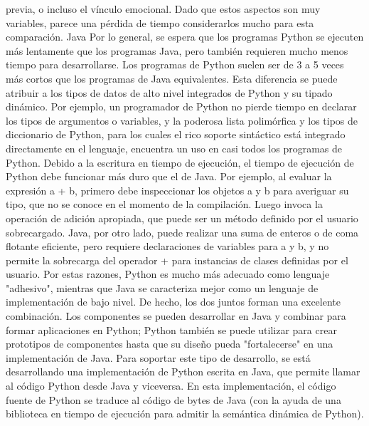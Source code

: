 previa, o incluso el vínculo emocional. Dado que estos aspectos son muy variables, parece
una pérdida de tiempo considerarlos mucho para esta comparación.
Java
Por lo general, se espera que los programas Python se ejecuten más lentamente que los
programas Java, pero también requieren mucho menos tiempo para desarrollarse. Los
programas de Python suelen ser de 3 a 5 veces más cortos que los programas de Java
equivalentes. Esta diferencia se puede atribuir a los tipos de datos de alto nivel integrados
de Python y su tipado dinámico. Por ejemplo, un programador de Python no pierde tiempo
en declarar los tipos de argumentos o variables, y la poderosa lista polimórfica y los tipos
de diccionario de Python, para los cuales el rico soporte sintáctico está integrado
directamente en el lenguaje, encuentra un uso en casi todos los programas de Python.
Debido a la escritura en tiempo de ejecución, el tiempo de ejecución de Python debe
funcionar más duro que el de Java. Por ejemplo, al evaluar la expresión a + b, primero debe
inspeccionar los objetos a y b para averiguar su tipo, que no se conoce en el momento de la
compilación. Luego invoca la operación de adición apropiada, que puede ser un método
definido por el usuario sobrecargado. Java, por otro lado, puede realizar una suma de
enteros o de coma flotante eficiente, pero requiere declaraciones de variables para a y b, y
no permite la sobrecarga del operador + para instancias de clases definidas por el usuario.
Por estas razones, Python es mucho más adecuado como lenguaje "adhesivo", mientras que
Java se caracteriza mejor como un lenguaje de implementación de bajo nivel. De hecho, los
dos juntos forman una excelente combinación. Los componentes se pueden desarrollar en
Java y combinar para formar aplicaciones en Python; Python también se puede utilizar para
crear prototipos de componentes hasta que su diseño pueda "fortalecerse" en una
implementación de Java. Para soportar este tipo de desarrollo, se está desarrollando una
implementación de Python escrita en Java, que permite llamar al código Python desde Java
y viceversa. En esta implementación, el código fuente de Python se traduce al código de
bytes de Java (con la ayuda de una biblioteca en tiempo de ejecución para admitir la
semántica dinámica de Python).

